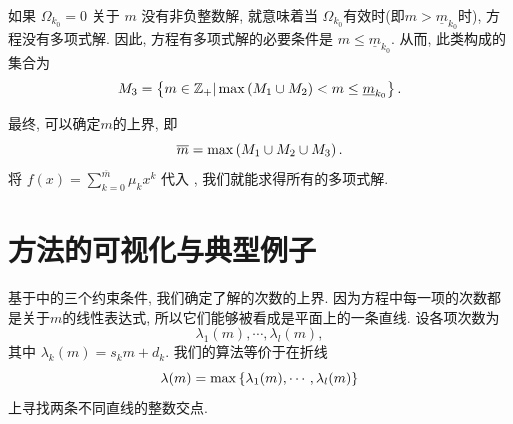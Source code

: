 如果 $\Omega_{k_0}=0$ 关于 $m$ 没有非负整数解, 就意味着当 $\Omega_{k_0}$有效时(即$m>\underline{m}_{k_0}$时), 方程没有多项式解. 因此, 方程有多项式解的必要条件是 $m\le \underline{m}_{k_0}$. 从而, 此类\BPthree{}构成的集合为 
\begin{equation}
M_3=\left\{m\in \mathbb Z_+|\max\left(M_1\cup M_2\right)<m\le \underline{m}_{k_0}\right\}. \label{BP32}
\end{equation}

最终, 可以确定$m$的上界, 即
\begin{equation}
\overline m =\max\left(M_1\cup M_2\cup M_3\right).
\end{equation}
将 $f(x)=\sum_{k=0}^{\overline m}{\mu_k x^k}$ 代入 , 我们就能求得所有的多项式解.

\section{方法的可视化与典型例子}\label{ch4sec2}
基于中的三个约束条件, 我们确定了解的次数的上界. 因为方程中每一项的次数都是关于$m$的线性表达式, 所以它们能够被看成是平面上的一条直线. 设各项次数为 
\begin{equation}
\lambda_1(m),\cdots,\lambda_l(m), \label{lines}
\end{equation}
其中 $\lambda_k(m)=s_k m+d_k$. 我们的算法等价于在折线
\begin{equation}
\lambda(m)=\max\left\{\lambda_1(m),\cdots,\lambda_l(m)\right\} \label{broken_line}
\end{equation}
上寻找两条不同直线的整数交点. 

